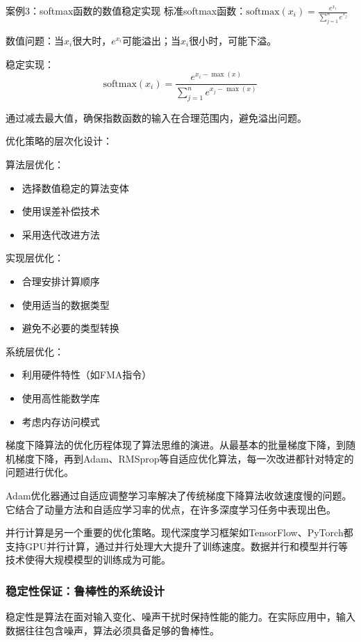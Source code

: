 案例3：softmax函数的数值稳定实现
标准softmax函数：$\text{softmax}(x_i) = \frac{e^{x_i}}{\sum_{j=1}^n e^{x_j}}$

数值问题：当$x_i$很大时，$e^{x_i}$可能溢出；当$x_i$很小时，可能下溢。

稳定实现：
$$\text{softmax}(x_i) = \frac{e^{x_i - \max(x)}}{\sum_{j=1}^n e^{x_j - \max(x)}}$$

通过减去最大值，确保指数函数的输入在合理范围内，避免溢出问题。

优化策略的层次化设计：

算法层优化：
\begin{itemize}
\item 选择数值稳定的算法变体
\item 使用误差补偿技术
\item 采用迭代改进方法
\end{itemize}

实现层优化：
\begin{itemize}
\item 合理安排计算顺序
\item 使用适当的数据类型
\item 避免不必要的类型转换
\end{itemize}

系统层优化：
\begin{itemize}
\item 利用硬件特性（如FMA指令）
\item 使用高性能数学库
\item 考虑内存访问模式
\end{itemize}

梯度下降算法的优化历程体现了算法思维的演进。从最基本的批量梯度下降，到随机梯度下降，再到Adam、RMSprop等自适应优化算法，每一次改进都针对特定的问题进行优化。

Adam优化器通过自适应调整学习率解决了传统梯度下降算法收敛速度慢的问题。它结合了动量方法和自适应学习率的优点，在许多深度学习任务中表现出色。

并行计算是另一个重要的优化策略。现代深度学习框架如TensorFlow、PyTorch都支持GPU并行计算，通过并行处理大大提升了训练速度。数据并行和模型并行等技术使得大规模模型的训练成为可能。

\subsubsection{稳定性保证：鲁棒性的系统设计}

稳定性是算法在面对输入变化、噪声干扰时保持性能的能力。在实际应用中，输入数据往往包含噪声，算法必须具备足够的鲁棒性。

